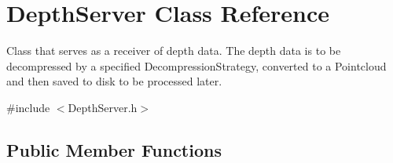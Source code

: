 \hypertarget{class_depth_server}{\section{Depth\+Server Class Reference}
\label{class_depth_server}
}


Class that serves as a receiver of depth data. The depth data is to be decompressed by a specified Decompression\+Strategy, converted to a Pointcloud and then saved to disk to be processed later.  




{\ttfamily \#include $<$Depth\+Server.\+h$>$}

\subsection*{Public Member Functions}
